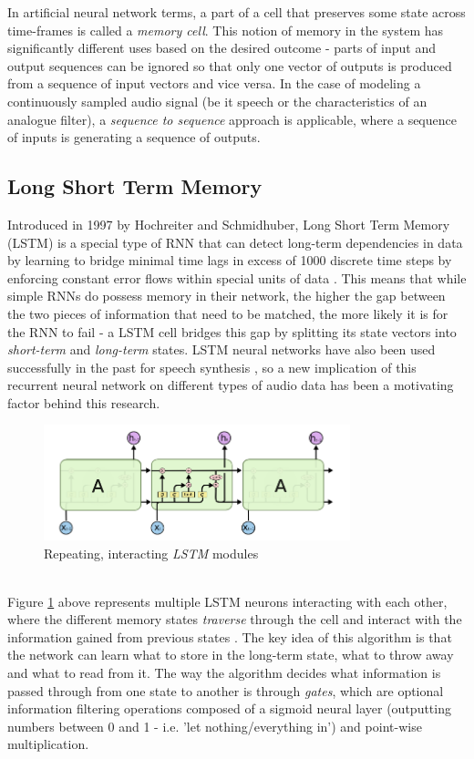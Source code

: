\documentclass[conference]{IEEEtran}
\begin{document}
In artificial neural network terms, a part of a cell that preserves some state across time-frames is called a \textit{memory cell}. This notion of memory in the system has significantly different uses based on the desired outcome - parts of input and output sequences can be ignored so that only one vector of outputs is produced from a sequence of input vectors and vice versa. In the case of modeling a continuously sampled audio signal (be it speech or the characteristics of an analogue filter), a \textit{sequence to sequence} approach is applicable, where a sequence of inputs is generating a sequence of outputs. 
\subsection{Long Short Term Memory}
Introduced in 1997 by Hochreiter and Schmidhuber, Long Short Term Memory (LSTM) is a special type of RNN that can detect long-term dependencies in data by learning to bridge minimal time lags in excess of 1000 discrete time steps by enforcing constant error flows within special units of data \cite{LSTM}. This means that while simple RNNs do possess memory in their network, the higher the gap between the two pieces of information that need to be matched, the more likely it is for the RNN to fail - a LSTM cell bridges this gap by splitting its state vectors into \textit{short-term} and \textit{long-term} states. LSTM neural networks have also been used successfully  in the past for speech synthesis \cite{LSTMspeech_ChungKDGCB15}, so a new implication of this recurrent neural network on different types of audio data has been a motivating factor behind this research.
\begin{figure}[h]
  \centering
  \includegraphics[width=3.5in]{Images/LSTM}
  \caption{Repeating, interacting \textit{LSTM} modules}
  \label{LSTM}
\end{figure}
\\
Figure \ref{LSTM} above represents multiple LSTM neurons interacting with each other, where the different memory states \textit{traverse} through the cell and interact with the information gained from previous states \cite{colah}. The key idea of this algorithm is that the network can learn what to store in the long-term state, what to throw away and what to read from it. The way the algorithm decides what information is passed through from one state to another is through \textit{gates}, which are optional information filtering operations composed of a sigmoid neural layer (outputting numbers between 0 and 1 - i.e. 'let nothing/everything in') and point-wise multiplication.
\end{document}
